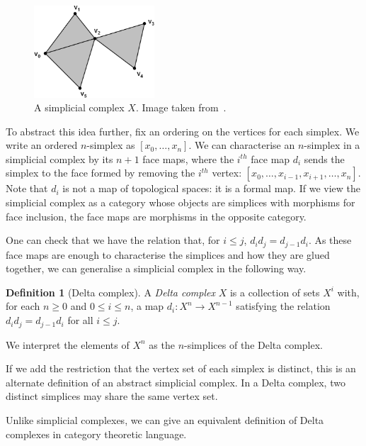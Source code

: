 \documentclass[a4paper,11pt,leqno]{article} \usepackage{amsmath}
\theoremstyle{definition}
\newtheorem{defn}{Definition}
\begin{document}
\begin{figure} \centering
  \includegraphics[width=0.4\textwidth]{figures/simp1.jpg} \caption{A simplicial
  complex $X$.
  Image taken from~\cite{Friedman08}.} \label{fig_simplicial_complex}
\end{figure}

To abstract this idea further, fix an ordering on the vertices for each
simplex.
We write an ordered $n$-simplex as $[x_0,\ldots,x_n]$.
We can characterise an $n$-simplex in a simplicial complex by its $n+1$ face
maps, where the $i^{th}$ face map $d_i$ sends the simplex to the face formed by
removing the $i^{th}$ vertex: $[x_0,\ldots,x_{i-1},x_{i+1},\dots,x_n]$.
Note that $d_i$ is not a map of topological spaces: it is a formal map.
If we view the simplicial complex as a category whose objects are simplices
with morphisms for face inclusion, the face maps are morphisms in the opposite
category.

One can check that we have the relation that, for $i\leq j$, $d_id_j
= d_{j-1}d_i$.
As these face maps are enough to characterise the simplices and how they are
glued together, we can generalise a simplicial complex in the following way.

\begin{defn}[Delta complex]
  A \emph{Delta complex} $X$ is a collection of sets $X^i$ with, for each
  $n\geq 0$ and $0\leq i\leq n$, a map $d_i: X^{n}\to X^{n-1}$ satisfying the
  relation $d_id_j = d_{j-1}d_i$ for all $i\leq j$.
\end{defn}

We interpret the elements of $X^n$ as the $n$-simplices of the Delta complex.

If we add the restriction that the vertex set of each simplex is distinct, this
is an alternate definition of an abstract simplicial complex.
In a Delta complex, two distinct simplices may share the same vertex set.

Unlike simplicial complexes, we can give an equivalent definition of Delta
complexes in category theoretic language.
\end{document}
